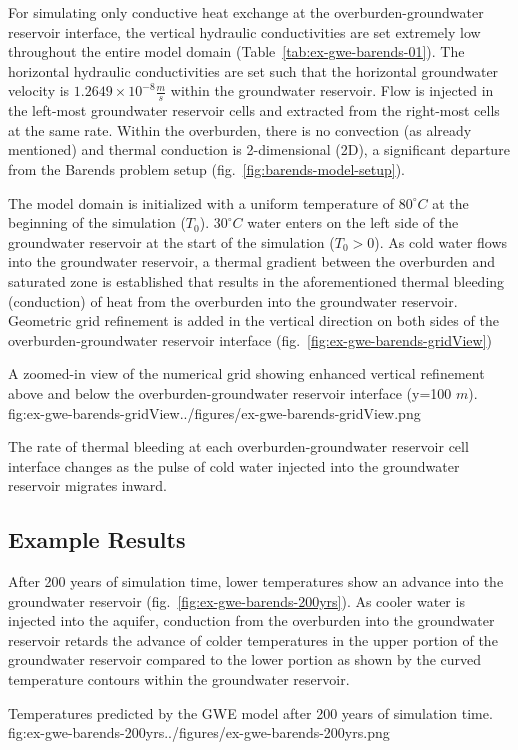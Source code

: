 For simulating only conductive heat exchange at the overburden-groundwater reservoir interface, the vertical hydraulic conductivities are set extremely low throughout the entire model domain (Table~\ref{tab:ex-gwe-barends-01}).  The horizontal hydraulic conductivities are set such that the horizontal groundwater velocity is $1.2649 \times 10^{-8} \frac {m}{s}$ within the groundwater reservoir.  Flow is injected in the left-most groundwater reservoir cells and extracted from the right-most cells at the same rate.  Within the overburden, there is no convection (as already mentioned) and thermal conduction is 2-dimensional (2D), a significant departure from the Barends problem setup (fig.~\ref{fig:barends-model-setup}).  

%

The model domain is initialized with a uniform temperature of $80^{\circ}C$ at the beginning of the simulation ($T_0$).  $30^{\circ}C$ water enters on the left side of the groundwater reservoir at the start of the simulation ($T_0 > 0$).  As cold water flows into the groundwater reservoir, a thermal gradient between the overburden and saturated zone is established that results in the aforementioned thermal bleeding (conduction) of heat from the overburden into the groundwater reservoir.  Geometric grid refinement is added in the vertical direction on both sides of the overburden-groundwater reservoir interface (fig.~\ref{fig:ex-gwe-barends-gridView})

\begin{StandardFigure}{
    A zoomed-in view of the numerical grid showing enhanced vertical refinement above and below the overburden-groundwater reservoir interface (y=100 $m$).}
    {fig:ex-gwe-barends-gridView}{../figures/ex-gwe-barends-gridView.png}
\end{StandardFigure}

The rate of thermal bleeding at each overburden-groundwater reservoir cell interface changes as the pulse of cold water injected into the groundwater reservoir migrates inward.  


\subsection{Example Results}

After 200 years of simulation time, lower temperatures show an advance into the groundwater reservoir (fig.~\ref{fig:ex-gwe-barends-200yrs}). As cooler water is injected into the aquifer, conduction from the overburden into the groundwater reservoir retards the advance of colder temperatures in the upper portion of the groundwater reservoir compared to the lower portion as shown by the curved temperature contours within the groundwater reservoir.

\begin{StandardFigure}{
    Temperatures predicted by the \mf GWE model after 200 years of simulation time.}
    {fig:ex-gwe-barends-200yrs}{../figures/ex-gwe-barends-200yrs.png}
\end{StandardFigure}



